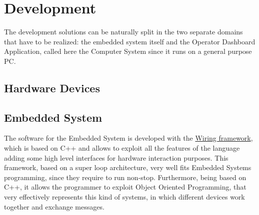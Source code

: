 \documentclass[a4paper,12pt]{report}
\begin{document}
	\chapter{Development}
	The development solutions can be naturally split in the two separate domains that have to be realized: the embedded system itself and the Operator Dashboard Application, called here the Computer System since it runs on a general purpose PC.
	
	\section{Hardware Devices}
	
	\section{Embedded System}
	The software for the Embedded System is developed with the \href{https://wiring.org.co/}{Wiring framework}, which is based on C++ and allows to exploit all the features of the language adding some high level interfaces for hardware interaction purposes. This framework, based on a super loop architecture, very well fits Embedded Systems programming, since they require to run non-stop. Furthermore, being based on C++, it allows the programmer to exploit Object Oriented Programming, that very effectively represents this kind of systems, in which different devices work together and exchange messages.
	
\end{document}
